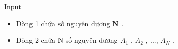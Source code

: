 Input
\begin{itemize}
	\item Dòng 1 chứa số nguyên dương \textbf{ N } .
	\item Dòng 2 chứa N số nguyên dương \textbf{ $A_{1}$} , \textbf{ $A_{2}$} , ..., \textbf{ $A_{N}$} .
\end{itemize}